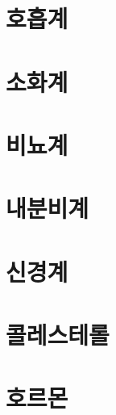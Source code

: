 \documentclass[12pt, a4paper, oneside]{book}
\let\stdsection\section
\renewcommand\section{\newpage\stdsection}
\begin{document}
\section{호흡계}


%
%
%
\newpage
\section{소화계}

%
%
%
\newpage
\section{비뇨계}


%
%
%
\newpage
\section{내분비계}


%
%
%
\newpage
\section{신경계}


%
		\section{콜레스테롤}


%
		\section{호르몬}
\end{document}
